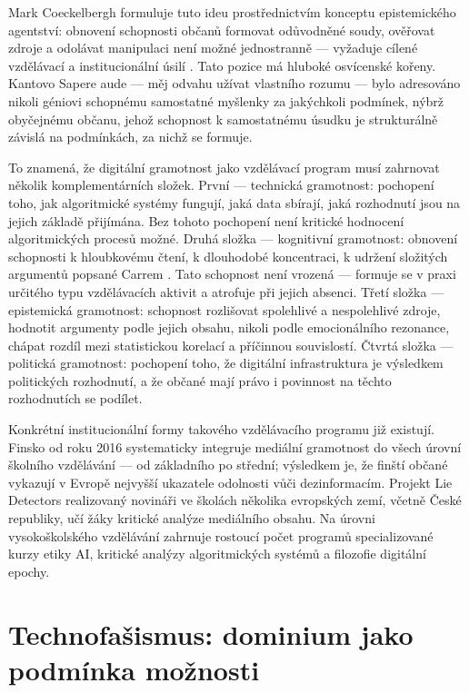 Mark Coeckelbergh formuluje tuto ideu prostřednictvím konceptu epistemického agentství: obnovení schopnosti občanů formovat odůvodněné soudy, ověřovat zdroje a odolávat manipulaci není možné jednostranně — vyžaduje cílené vzdělávací a institucionální úsilí \parencite{Coeckelbergh23}.
Tato pozice má hluboké osvícenské kořeny. Kantovo Sapere aude — měj odvahu užívat vlastního rozumu — bylo adresováno nikoli géniovi schopnému samostatné myšlenky za jakýchkoli podmínek, nýbrž obyčejnému občanu, jehož schopnost k samostatnému úsudku je strukturálně závislá na podmínkách, za nichž se formuje.

To znamená, že digitální gramotnost jako vzdělávací program musí zahrnovat několik komplementárních složek.
První — technická gramotnost: pochopení toho, jak algoritmické systémy fungují, jaká data sbírají, jaká rozhodnutí jsou na jejich základě přijímána.
Bez tohoto pochopení není kritické hodnocení algoritmických procesů možné.
Druhá složka — kognitivní gramotnost: obnovení schopnosti k hloubkovému čtení, k dlouhodobé koncentraci, k udržení složitých argumentů popsané Carrem \parencite{Carr10}.
Tato schopnost není vrozená — formuje se v praxi určitého typu vzdělávacích aktivit a atrofuje při jejich absenci. Třetí složka — epistemická gramotnost: schopnost rozlišovat spolehlivé a nespolehlivé zdroje, hodnotit argumenty podle jejich obsahu, nikoli podle emocionálního rezonance, chápat rozdíl mezi statistickou korelací a příčinnou souvislostí. Čtvrtá složka — politická gramotnost: pochopení toho, že digitální infrastruktura je výsledkem politických rozhodnutí, a že občané mají právo i povinnost na těchto rozhodnutích se podílet.

Konkrétní institucionální formy takového vzdělávacího programu již existují. Finsko od roku 2016 systematicky integruje mediální gramotnost do všech úrovní školního vzdělávání — od základního po střední; výsledkem je, že finští občané vykazují v Evropě nejvyšší ukazatele odolnosti vůči dezinformacím.
Projekt Lie Detectors realizovaný novináři ve školách několika evropských zemí, včetně České republiky, učí žáky kritické analýze mediálního obsahu. Na úrovni vysokoškolského vzdělávání zahrnuje rostoucí počet programů specializované kurzy etiky AI, kritické analýzy algoritmických systémů a filozofie digitální epochy.
\section{Technofašismus: dominium jako podmínka možnosti}

